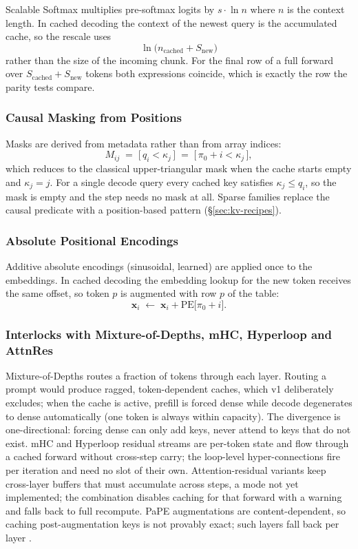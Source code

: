 Scalable Softmax multiplies pre-softmax logits by $s\cdot\ln n$ where $n$ is the context length. In cached decoding the context of the newest query is the accumulated cache, so the rescale uses
\[
\ln\big(n_{\text{cached}} + S_{\text{new}}\big)
\]
rather than the size of the incoming chunk. For the final row of a full forward over $S_{\text{cached}}+S_{\text{new}}$ tokens both expressions coincide, which is exactly the row the parity tests compare.

\subsubsection{Causal Masking from Positions}

Masks are derived from metadata rather than from array indices:
\[
M_{ij} \;=\; \big[\,q_i < \kappa_j\,\big] \;=\; \big[\,\pi_0 + i < \kappa_j\,\big],
\]
which reduces to the classical upper-triangular mask when the cache starts empty and $\kappa_j = j$. For a single decode query every cached key satisfies $\kappa_j \le q_i$, so the mask is empty and the step needs no mask at all. Sparse families replace the causal predicate with a position-based pattern (\S\ref{sec:kv-recipes}).

\subsubsection{Absolute Positional Encodings}

Additive absolute encodings (sinusoidal, learned) are applied once to the embeddings. In cached decoding the embedding lookup for the new token receives the same offset, so token $p$ is augmented with row $p$ of the table:
\[
\mathbf{x}_i \;\leftarrow\; \mathbf{x}_i + \text{PE}\big[\pi_0 + i\big].
\]

\subsubsection{Interlocks with Mixture-of-Depths, mHC, Hyperloop and AttnRes}

Mixture-of-Depths routes a fraction of tokens through each layer. Routing a prompt would produce ragged, token-dependent caches, which v1 deliberately excludes; when the cache is active, prefill is forced dense while decode degenerates to dense automatically (one token is always within capacity). The divergence is one-directional: forcing dense can only add keys, never attend to keys that do not exist. mHC and Hyperloop residual streams are per-token state and flow through a cached forward without cross-step carry; the loop-level hyper-connections fire per iteration and need no slot of their own. Attention-residual variants keep cross-layer buffers that must accumulate across steps, a mode not yet implemented; the combination disables caching for that forward with a warning and falls back to full recompute. PaPE augmentations are content-dependent, so caching post-augmentation keys is not provably exact; such layers fall back per layer \citep{ohrstrom_pape_2026}.

